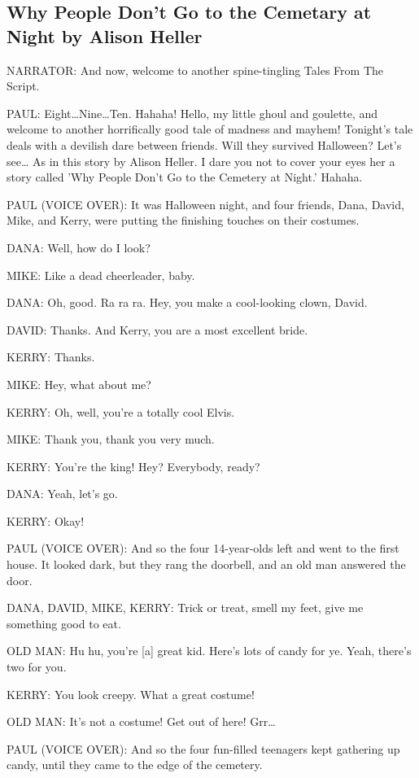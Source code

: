 \subsection{Why People Don't Go to the Cemetary at Night by Alison Heller}

NARRATOR:
And now, welcome to another spine-tingling Tales From The Script.

PAUL:
Eight\dots Nine\dots Ten.
Hahaha!
Hello, my little ghoul and goulette, and welcome to another horrifically good tale of madness and mayhem!
Tonight's tale deals with a devilish dare between friends.
Will they survived Halloween?
Let's see\dots
As in this story by Alison Heller.
I dare you not to cover your eyes her a story called 'Why People Don't Go to the Cemetery at Night.'
Hahaha.

PAUL (VOICE OVER):
It was Halloween night, and four friends, Dana, David, Mike, and Kerry, were putting the finishing touches on their costumes.

DANA:
Well, how do I look?

MIKE:
Like a dead cheerleader, baby.

DANA:
Oh, good.
Ra ra ra.
Hey, you make a cool-looking clown, David.

DAVID:
Thanks.
And Kerry, you are a most excellent bride.

KERRY:
Thanks.

MIKE:
Hey, what about me?

KERRY:
Oh, well, you're a totally cool Elvis.

MIKE:
Thank you, thank you very much.

KERRY:
You're the king!
Hey?
Everybody, ready?

DANA:
Yeah, let's go.

KERRY:
Okay!

PAUL (VOICE OVER):
And so the four 14-year-olds left and went to the first house.
It looked dark, but they rang the doorbell, and an old man answered the door.

DANA, DAVID, MIKE, KERRY:
Trick or treat, smell my feet, give me something good to eat.

OLD MAN:
Hu hu, you're [a] great kid.
Here's lots of candy for ye.
Yeah, there's two for you.

KERRY:
You look creepy.
What a great costume!

OLD MAN:
It's not a costume!
Get out of here!
Grr\dots

PAUL (VOICE OVER):
And so the four fun-filled teenagers kept gathering up candy, until they came to the edge of the cemetery.

